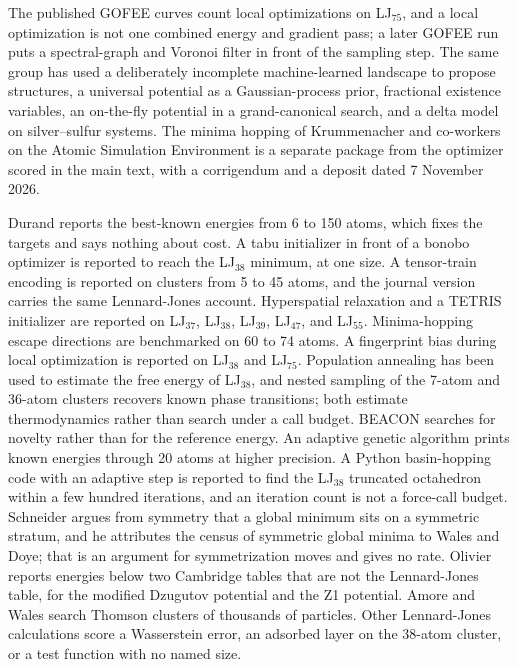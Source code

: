\documentclass[journal=jctcce,manuscript=suppinfo]{achemso}
\begin{document}
The published GOFEE curves count local optimizations on LJ\(_{75}\), and a
local optimization is not one combined energy and gradient pass; a later GOFEE run puts a
spectral-graph and Voronoi filter in front of the sampling step.
\cite{christiansenAgox2022,slavenskyClassifier2024}
The same group has used a deliberately incomplete machine-learned
landscape to propose structures, a universal potential as a Gaussian-process
prior, fractional existence variables, an on-the-fly potential in a
grand-canonical search, and a delta model on silver--sulfur systems.
\cite{slavenskyComplementary2023,lyngbyUniversalPrior2024,larsenFractional2023,quinlivanGrandCanonical2026,pitfieldActiveDelta2026}
The minima hopping of Krummenacher and co-workers on the Atomic
Simulation Environment is a separate package from the optimizer scored in
the main text, with a corrigendum and a deposit dated 7 November 2026.
\cite{krummenacherMinimaHopping2024,krummenacherAseMh2026,goedecker2004}

Durand reports the best-known energies from 6 to 150 atoms, which fixes the
targets and says nothing about cost.
\cite{durandLennardJones2026}
A tabu initializer in front of a bonobo optimizer is reported to reach
the LJ\(_{38}\) minimum, at one size.
\cite{chakrabortyBonobo2026}
A tensor-train encoding is reported on clusters from 5 to 45 atoms,
and the journal version carries the same Lennard-Jones account.
\cite{sozykinTensorTrain2026}
Hyperspatial relaxation and a TETRIS initializer are reported on
LJ\(_{37}\), LJ\(_{38}\), LJ\(_{39}\), LJ\(_{47}\), and LJ\(_{55}\).
\cite{gochitashviliGosh2025}
Minima-hopping escape directions are benchmarked on 60 to 74 atoms.
\cite{schaerfMinimaHopping2026}
A fingerprint bias during local optimization is reported on LJ\(_{38}\)
and LJ\(_{75}\).
\cite{taoFingerprint2024}
Population annealing has been used to estimate the free energy of
LJ\(_{38}\), and nested sampling of the 7-atom and 36-atom clusters
recovers known phase transitions; both estimate thermodynamics rather than
search under a call budget.
\cite{kowaguchiLj382026,maillardNested2025}
BEACON searches for novelty rather than for the reference energy.
\cite{tangBeaconNovelty2026}
An adaptive genetic algorithm prints known energies through 20 atoms at
higher precision.
\cite{willneckerGenetic2024}
A Python basin-hopping code with an adaptive step is reported to find
the LJ\(_{38}\) truncated octahedron within a few hundred iterations, and
an iteration count is not a force-call budget.
\cite{carmonaBasinHopping2025}
Schneider argues from symmetry that a global minimum sits on a
symmetric stratum, and he attributes the census of symmetric global
minima to Wales and Doye; that is an argument for symmetrization moves
and gives no rate.
\cite{schneiderSymmetry2026,wales1997}
Olivier reports energies below two Cambridge tables that are not the
Lennard-Jones table, for the modified Dzugutov potential and the Z1
potential.
\cite{olivierPairTables2026}
Amore and Wales search Thomson clusters of thousands of particles.
\cite{amoreThomson2026}
Other Lennard-Jones calculations score a Wasserstein error, an
adsorbed layer on the 38-atom cluster, or a test function with no named
size.
\cite{yallupNested2026,chatbiphoAdsorbate2025,gargLennardJones2025}
\end{document}
